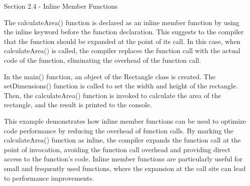 \begin{notes}{Section 2.4 - Inline Member Functions}
\begin{highlight}
        The calculateArea() function is declared as an inline member function by using the inline keyword before the function declaration. This suggests to the compiler that the function should be expanded 
        at the point of its call. In this case, when calculateArea() is called, the compiler replaces the function call with the actual code of the function, eliminating the overhead of the function call.
    
        In the main() function, an object of the Rectangle class is created. The setDimensions() function is called to set the width and height of the rectangle. Then, the calculateArea() function is invoked 
        to calculate the area of the rectangle, and the result is printed to the console.
    
        This example demonstrates how inline member functions can be used to optimize code performance by reducing the overhead of function calls. By marking the calculateArea() function as inline, the compiler 
        expands the function call at the point of invocation, avoiding the function call overhead and providing direct access to the function's code. Inline member functions are particularly useful for small and frequently 
        used functions, where the expansion at the call site can lead to performance improvements.
    \end{highlight}
\end{notes}

